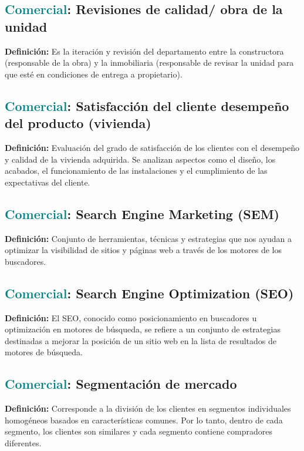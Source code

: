 \documentclass[12pt]{article}
\begin{document}
\subsection{\textcolor{teal}{Comercial}: Revisiones de calidad/ obra de la unidad}
\textbf{Definición:} Es la iteración y revisión del departamento entre la constructora (responsable de la obra) y la inmobiliaria (responsable de revisar la unidad para que esté en condiciones de entrega a propietario).
\subsection{\textcolor{teal}{Comercial}: Satisfacción del cliente desempeño del producto (vivienda)}
\textbf{Definición:} Evaluación del grado de satisfacción de los clientes con el desempeño y calidad de la vivienda adquirida. Se analizan aspectos como el diseño, los acabados, el funcionamiento de las instalaciones y el cumplimiento de las expectativas del cliente.
\subsection{\textcolor{teal}{Comercial}: Search Engine Marketing (SEM)}
\textbf{Definición:} Conjunto de herramientas, técnicas y estrategias que nos ayudan a optimizar la visibilidad de sitios y páginas web a través de los motores de los buscadores.
\subsection{\textcolor{teal}{Comercial}: Search Engine Optimization (SEO)}
\textbf{Definición:} El SEO, conocido como posicionamiento en buscadores u optimización en motores de búsqueda, se refiere a un conjunto de estrategias destinadas a mejorar la posición de un sitio web en la lista de resultados de motores de búsqueda.
\subsection{\textcolor{teal}{Comercial}: Segmentación de mercado}
\textbf{Definición:} Corresponde a la división de los clientes en segmentos individuales homogéneos basados en características comunes. Por lo tanto, dentro de cada segmento, los clientes son similares y cada segmento contiene compradores diferentes.
\end{document}
